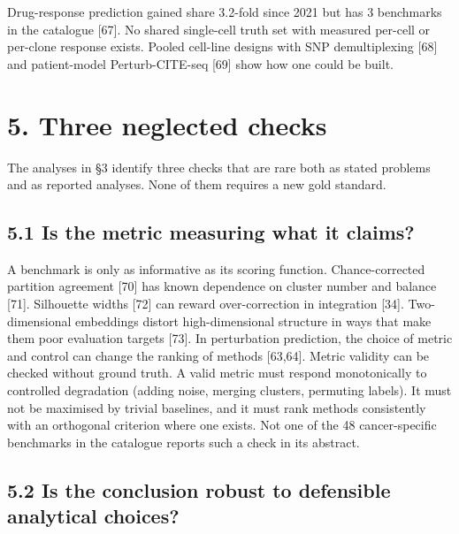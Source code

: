 \documentclass[11pt]{article}
\begin{document}
Drug-response prediction gained share 3.2-fold since 2021 but has 3
benchmarks in the catalogue {[}67{]}. No shared single-cell truth set
with measured per-cell or per-clone response exists. Pooled cell-line
designs with SNP demultiplexing {[}68{]} and patient-model
Perturb-CITE-seq {[}69{]} show how one could be built.

\section{5. Three neglected checks}\label{three-neglected-checks}

The analyses in §3 identify three checks that are rare both as stated
problems and as reported analyses. None of them requires a new gold
standard.

\subsection{5.1 Is the metric measuring what it claims?}\label{is-the-metric-measuring-what-it-claims}

A benchmark is only as informative as its scoring function.
Chance-corrected partition agreement {[}70{]} has known dependence on
cluster number and balance {[}71{]}. Silhouette widths {[}72{]} can
reward over-correction in integration {[}34{]}. Two-dimensional
embeddings distort high-dimensional structure in ways that make them
poor evaluation targets {[}73{]}. In perturbation prediction, the choice
of metric and control can change the ranking of methods {[}63,64{]}.
Metric validity can be checked without ground truth. A valid metric must
respond monotonically to controlled degradation (adding noise, merging
clusters, permuting labels). It must not be maximised by trivial
baselines, and it must rank methods consistently with an orthogonal
criterion where one exists. Not one of the 48 cancer-specific benchmarks
in the catalogue reports such a check in its abstract.

\subsection{5.2 Is the conclusion robust to defensible analytical choices?}\label{is-the-conclusion-robust-to-defensible-analytical-choices}
\end{document}
